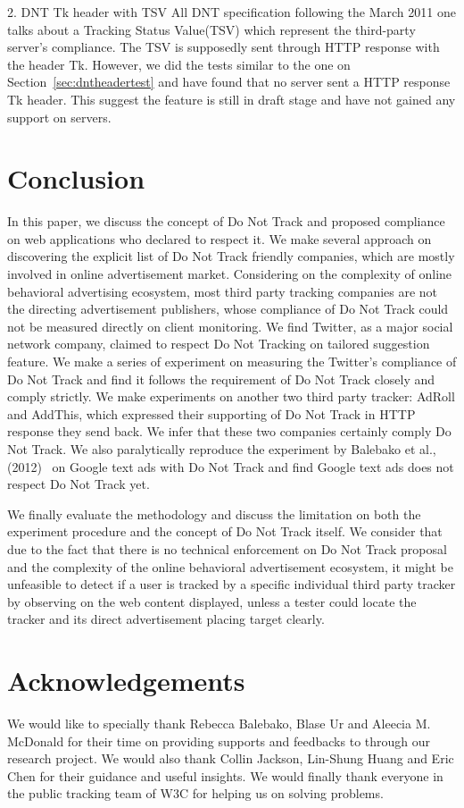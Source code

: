 \documentclass{sig-alternate}
\begin{document}
2. DNT Tk header with TSV
  All DNT specification following the March 2011 one talks about a Tracking Status Value(TSV) which represent the third-party server’s compliance. The TSV is supposedly sent through HTTP response with the header Tk. However, we did the tests similar to the one on Section~\ref{sec:dntheadertest} and have found that no server sent a HTTP response Tk header. This suggest the feature is still in draft stage and have not gained any support on servers. 


\section{Conclusion} \label{sec:conclusion}

In this paper, we discuss the concept of Do Not Track and proposed compliance on web applications who declared to respect it. We make several approach on discovering the explicit list of Do Not Track friendly companies, which are mostly involved in online advertisement market. Considering on the complexity of online behavioral advertising ecosystem, most third party tracking companies are not the directing advertisement publishers, whose compliance of Do Not Track could not be measured directly on client monitoring. We find Twitter, as a major social network company, claimed to respect Do Not Tracking on tailored suggestion feature. We make a series of experiment on measuring the Twitter's compliance of Do Not Track and find it follows the requirement of Do Not Track closely and comply strictly. We make experiments on another two third party tracker: AdRoll and AddThis, which expressed their supporting of Do Not Track in HTTP response they send back. We infer that these two companies certainly comply Do Not Track. We also paralytically reproduce the experiment by Balebako et al., (2012)~\cite{balebako2012measuring} on Google text ads with Do Not Track and find Google text ads does not respect Do Not Track yet. 

We finally evaluate the methodology and discuss the limitation on both the experiment procedure and the concept of Do Not Track itself. We consider that due to the fact that there is no technical enforcement on Do Not Track proposal and the complexity of the online behavioral advertisement ecosystem, it might be unfeasible to detect if a user is tracked by a specific individual third party tracker by observing on the web content displayed, unless a tester could locate the tracker and its direct advertisement placing target clearly.

\section*{Acknowledgements}

We would like to specially thank Rebecca Balebako, Blase Ur and Aleecia M. McDonald for their time on providing supports and feedbacks to through our research project. We would also thank Collin Jackson, Lin-Shung Huang and Eric Chen for their guidance and useful insights. We would finally thank everyone in the public tracking team of W3C for helping us on solving problems.


\end{document}
